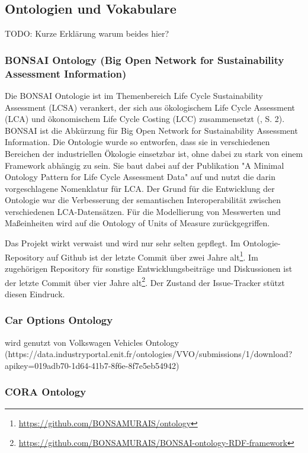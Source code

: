 \documentclass{article}
\begin{document}
\subsection{Ontologien und Vokabulare}

TODO: Kurze Erklärung warum beides hier?

\subsubsection{BONSAI Ontology (Big Open Network for Sustainability Assessment Information)}

Die BONSAI Ontologie ist im Themenbereich Life Cycle Sustainability Assessment (LCSA) verankert, der sich aus ökologischem Life Cycle Assessment (LCA) und ökonomischem Life Cycle Costing (LCC) zusammensetzt (\cite{ghose2022core}, S. 2).
BONSAI ist die Abkürzung für Big Open Network for Sustainability Assessment Information.
Die Ontologie wurde so entworfen, dass sie in verschiedenen Bereichen der industriellen Ökologie einsetzbar ist, ohne dabei zu stark von einem Framework abhängig zu sein.
Sie baut dabei auf der Publikation "A Minimal Ontology Pattern for Life Cycle Assessment Data" \cite{vardem2015anminimal} auf und nutzt die darin vorgeschlagene Nomenklatur für LCA.
Der Grund für die Entwicklung der Ontologie war die Verbesserung der semantischen Interoperabilität zwischen verschiedenen LCA-Datensätzen.
Für die Modellierung von Messwerten und Maßeinheiten wird auf die Ontology of Units of Measure \cite{rijgersberg2013ontology} zurückgegriffen.

Das Projekt wirkt verwaist und wird nur sehr selten gepflegt. Im Ontologie-Repository auf Github ist der letzte Commit über zwei Jahre alt\footnote{\url{https://github.com/BONSAMURAIS/ontology}}. Im zugehörigen Repository für sonstige Entwicklungsbeiträge und Diskussionen ist der letzte Commit über vier Jahre alt\footnote{\url{https://github.com/BONSAMURAIS/BONSAI-ontology-RDF-framework}}. Der Zustand der Issue-Tracker stützt diesen Eindruck.

\subsubsection{Car Options Ontology}

wird genutzt von Volkswagen Vehicles Ontology (https://data.industryportal.enit.fr/ontologies/VVO/submissions/1/download?apikey=019adb70-1d64-41b7-8f6e-8f7e5eb54942)

\subsubsection{CORA Ontology}
\end{document}
